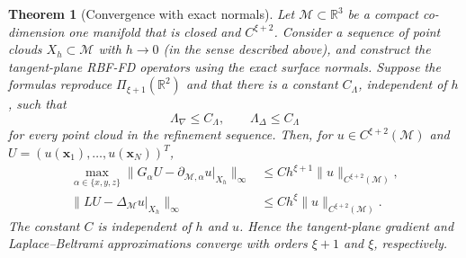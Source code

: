 \documentclass[10pt,a4paper]{amsart}
\newtheorem{theorem}{Theorem}
\begin{document}
\begin{theorem}[Convergence with exact normals]
\label{thm:exact-normal-tangent-rbffd}
Let \(\mathcal M\subset\mathbb R^3\) be a compact co-dimension one manifold that is closed and
\(C^{\xi+2}\).  Consider a sequence of point clouds \(X_h\subset\mathcal M\)
with \(h\to0\) (in the sense described above), and construct the tangent-plane RBF-FD operators using the
exact surface normals.  Suppose the formulas reproduce
\(\Pi_{\xi+1}(\mathbb R^2)\) and that there is a constant \(C_\Lambda\),
independent of \(h\), such that
\begin{equation}
  \Lambda_\nabla\leq C_\Lambda,
  \qquad
  \Lambda_\Delta\leq C_\Lambda
  \label{eq:theory-exact-uniform-stability}
\end{equation}
for every point cloud in the refinement sequence.  Then, for
\(u\in C^{\xi+2}(\mathcal M)\) and
\(U=(u(\bm x_1),\ldots,u(\bm x_N))^T\),
\begin{align}
  \max_{\alpha\in\{x,y,z\}}
  \|G_\alpha U-\partial_{\mathcal M,\alpha}u|_{X_h}\|_\infty
  &\leq C h^{\xi+1}\|u\|_{C^{\xi+2}(\mathcal M)},
  \label{eq:exact-normal-global-gradient}\\
  \|LU-\Delta_{\mathcal M}u|_{X_h}\|_\infty
  &\leq C h^\xi\|u\|_{C^{\xi+2}(\mathcal M)}.
  \label{eq:exact-normal-global-laplacian}
\end{align}
The constant \(C\) is independent of \(h\) and \(u\).  Hence the tangent-plane
gradient and Laplace--Beltrami approximations converge with orders
\(\xi+1\) and \(\xi\), respectively.
\end{theorem}
\end{document}
